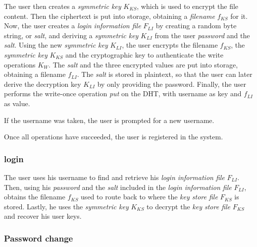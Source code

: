 The user then creates a \textit{symmetric key} $K_{KS}$, which is used to
encrypt the file content. Then the ciphertext
is put into storage, obtaining a \textit{filename} $f_{KS}$ for it. Now, the user
creates a \textit{login information file} $F_{LI}$ by creating a random
byte string, or \textit{salt}, and deriving a \textit{symmetric key} $K_{LI}$ from the user
\textit{password} and the \textit{salt}.
Using the new \textit{ symmetric key} $K_{LI}$, the user encrypts the
filename $f_{KS}$,
the \textit{symmetric key} $K_{KS}$ and the cryptographic key to
authenticate the write operations $K_W$.
 The \textit{salt} and the three encrypted values are put
into storage, obtaining a filename $f_{LI}$. The \textit{salt} is stored
in plaintext, so that the user can later derive the decryption
key $K_{LI}$ by only providing the password. Finally, the user
performs the write-once operation \textit{put} on the DHT, with
username as key and $f_{LI}$ as value.

If the username was taken,
the user is prompted for a new username.

Once all operations
have succeeded, the user is registered in the system.


\subsubsection{login}


The user uses his username to find and retrieve his \textit{login information
file} $F_{LI}$. Then, using his \textit{password} and the \textit{salt} included in the
\textit{login information file} $F_{LI}$, obtains the filename
$f_{KS}$ used to
route back to where the \textit{key store file} $F_{KS}$ is stored.  Lastly, he uses the
\textit{symmetric key} $K_{KS}$ to decrypt the \textit{key store file}
$F_{KS}$ and recover his user keys.

\subsubsection{Password change}


